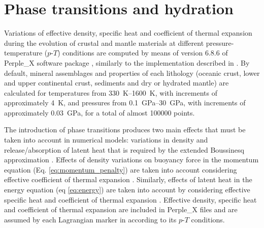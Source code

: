 \section{Phase transitions and hydration}\label{sec:phase}
Variations of effective density, specific heat and coefficient of thermal expansion during the evolution of crustal and mantle materials at different pressure-temperature ($p$-$T$) conditions are computed by means of version 6.8.6 of Perple\_X software package \citep{Connolly2005}, similarly to the implementation described in \citet{Marotta2020}. By default, mineral assemblages and properties of each lithology (oceanic crust, lower and upper continental crust, sediments and dry or hydrated mantle) are calculated for temperatures from \SIrange{330}{1600}{\kelvin}, with increments of approximately \SI{4}{\kelvin}, and pressures from \SIrange{0.1}{30}{\giga\pascal}, with increments of approximately \SI{0.03}{\giga\pascal}, for a total of almost 100000 points.

The introduction of phase transitions produces two main effects that must be taken into account in numerical models: variations in density and release/absorption of latent heat that is required by the extended Boussinesq approximation \citep{Tackley2010}. Effects of density variations on buoyancy force in the momentum equation (Eq. \ref{eq:momentum_penalty}) are taken into account considering effective coefficient of thermal expansion \citep{Christensen1985,Zhong2015}. Similarly, effects of latent heat in the energy equation (eq \ref{eq:energy}) are taken into account by considering effective specific heat and coefficient of thermal expansion
\citep{Christensen1985,Tackley2010,Zhong2015}. Effective density, specific heat and coefficient of thermal expansion are included in Perple\_X files and are assumed by each Lagrangian marker in according to its $p$-$T$ conditions.

